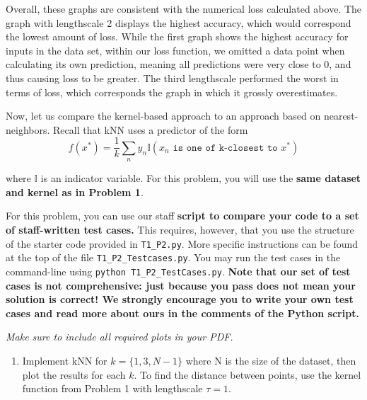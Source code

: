 \documentclass[submit]{harvardml}
\begin{document}
\noin Overall, these graphs are consistent with the numerical loss calculated above. The graph with lengthscale 2 displays the highest accuracy, which would correspond the lowest amount of loss. While the first graph shows the highest accuracy for inputs in the data set, within our loss function, we omitted a data point when calculating its own prediction, meaning all predictions were very close to 0, and thus causing loss to be  greater. The third lengthscale performed the worst in terms of loss, which corresponds the graph in which it grossly overestimates.
\newpage


\begin{problem}

Now, let us compare the kernel-based approach to an approach based on
nearest-neighbors.  Recall that kNN uses a predictor of the form
  \begin{equation*}
    f(x^*) = \frac{1}{k} \sum_n y_n \mathbb{I}(x_n \texttt{ is one of k-closest to } x^*)
  \end{equation*}

\noindent where $\mathbb{I}$ is an indicator variable. For this problem, you will use the \textbf{same dataset and kernel as in Problem 1}.


For this problem, you can use our staff \textbf{script to compare your code to a set of staff-written test cases.} This requires, however, that you use the structure of the starter code provided in \texttt{T1\_P2.py}. More specific instructions can be found at the top of the file \texttt{T1\_P2\_Testcases.py}. You may run the test cases in the command-line using \texttt{python T1\_P2\_TestCases.py}.
\textbf{Note that our set of test cases is not comprehensive: just because you pass does not mean your solution is correct! We strongly encourage you to write your own test cases and read more about ours in the comments of the Python script.}

\vspace{0.5cm}
\noindent\emph{Make sure to include all required plots in your PDF.}


\begin{enumerate}

\item Implement kNN for $k=\{1, 3, N-1\}$ where N is the size of the dataset, then plot the results for each $k$. To find the distance between points, use the kernel function from Problem 1 with lengthscale $\tau=1$. 


\end{enumerate}
\end{problem}
\end{document}
